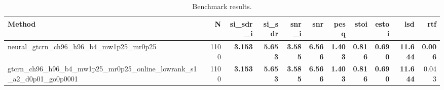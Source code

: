 \begin{table}[t]
\centering
\caption{Benchmark results.}
\label{tab:bench}
\begin{tabular}{lrrrrrrrrrr}
\toprule
Method & N & si\_sdr\_i & si\_sdr & snr\_i & snr & pesq & stoi & estoi & lsd & rtf \\
\midrule
neural_gtcrn_ch96_h96_b4_mw1p25_mr0p25 & 1100 & \textbf{3.153} & \textbf{5.653} & \textbf{3.585} & \textbf{6.566} & \textbf{1.403} & \textbf{0.816} & \textbf{0.690} & \textbf{11.644} & \textbf{0.006} \\
gtcrn_ch96_h96_b4_mw1p25_mr0p25_online_lowrank_s1_a2_d0p01_go0p0001 & 1100 & \textbf{3.153} & \textbf{5.653} & \textbf{3.585} & \textbf{6.566} & \textbf{1.403} & \textbf{0.816} & \textbf{0.690} & \textbf{11.644} & 0.043 \\
\bottomrule
\end{tabular}
\end{table}